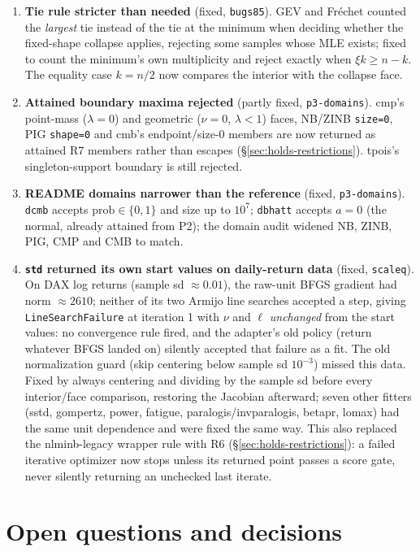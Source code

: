 \documentclass[11pt]{article}
\newcommand{\code}[1]{\texttt{#1}}
\theoremstyle{plain}
\theoremstyle{definition}
\theoremstyle{remark}
\begin{document}
\begin{enumerate}
    standardization.
  \item[B6] \textbf{Tie rule stricter than needed} (fixed, \code{bugs85}).
    GEV and Fr\'echet counted the \emph{largest} tie instead of the tie at
    the minimum when deciding whether the fixed-shape collapse applies,
    rejecting some samples whose MLE exists; fixed to count the minimum's
    own multiplicity and reject exactly when $\xi k \ge n-k$. The equality
    case $k=n/2$ now compares the interior with the collapse face.
  \item[B7] \textbf{Attained boundary maxima rejected} (partly fixed,
    \code{p3-domains}). cmp's point-mass ($\lambda=0$) and geometric
    ($\nu=0$, $\lambda<1$) faces, NB/ZINB \code{size=0}, PIG
    \code{shape=0} and cmb's endpoint/size-0 members are now returned as
    attained R7 members rather than escapes (\S\ref{sec:holds-restrictions}).
    tpois's singleton-support boundary is still rejected.
  \item[B8] \textbf{README domains narrower than the reference} (fixed,
    \code{p3-domains}). \code{dcmb} accepts $\mathrm{prob}\in\{0,1\}$ and
    size up to $10^7$; \code{dbhatt} accepts $a=0$ (the normal, already
    attained from P2); the domain audit widened NB, ZINB, PIG, CMP and CMB
    to match.
  \item[TASK-77] \textbf{\code{std} returned its own start values on
    daily-return data} (fixed, \code{scaleq}). On DAX log returns (sample
    sd $\approx0.01$), the raw-unit BFGS gradient had norm $\approx2610$;
    neither of its two Armijo line searches accepted a step, giving
    \code{LineSearchFailure} at iteration 1 with $\nu$ and $\ell$
    \emph{unchanged} from the start values: no convergence rule fired, and
    the adapter's old policy (return whatever BFGS landed on) silently
    accepted that failure as a fit. The old normalization guard (skip
    centering below sample sd $10^{-3}$) missed this data. Fixed by always
    centering and dividing by the sample sd before every interior/face
    comparison, restoring the Jacobian afterward; seven other fitters
    (sstd, gompertz, power, fatigue, paralogis/invparalogis, betapr, lomax)
    had the same unit dependence and were fixed the same way. This also
    replaced the nlminb-legacy wrapper rule with R6
    (\S\ref{sec:holds-restrictions}): a failed iterative optimizer now
    stops unless its returned point passes a score gate, never silently
    returning an unchecked last iterate.
\end{enumerate}

\section{Open questions and decisions}\label{sec:open}
\end{document}
